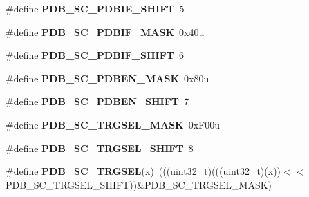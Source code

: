 \begin{DoxyCompactItemize}
\item 
\#define {\bfseries P\+D\+B\+\_\+\+S\+C\+\_\+\+P\+D\+B\+I\+E\+\_\+\+S\+H\+I\+FT}~5\hypertarget{group__PDB__Register__Masks_ga8632d420c92ec79e08c43f7d3acc79cf}{}\label{group__PDB__Register__Masks_ga8632d420c92ec79e08c43f7d3acc79cf}

\item 
\#define {\bfseries P\+D\+B\+\_\+\+S\+C\+\_\+\+P\+D\+B\+I\+F\+\_\+\+M\+A\+SK}~0x40u\hypertarget{group__PDB__Register__Masks_ga57cd111abf2b5780daddb6619498ef7a}{}\label{group__PDB__Register__Masks_ga57cd111abf2b5780daddb6619498ef7a}

\item 
\#define {\bfseries P\+D\+B\+\_\+\+S\+C\+\_\+\+P\+D\+B\+I\+F\+\_\+\+S\+H\+I\+FT}~6\hypertarget{group__PDB__Register__Masks_ga98ea01f76c8cc1bc944830d4d8387118}{}\label{group__PDB__Register__Masks_ga98ea01f76c8cc1bc944830d4d8387118}

\item 
\#define {\bfseries P\+D\+B\+\_\+\+S\+C\+\_\+\+P\+D\+B\+E\+N\+\_\+\+M\+A\+SK}~0x80u\hypertarget{group__PDB__Register__Masks_ga5582f0b88e7ae5e9dcf69f3a859c4470}{}\label{group__PDB__Register__Masks_ga5582f0b88e7ae5e9dcf69f3a859c4470}

\item 
\#define {\bfseries P\+D\+B\+\_\+\+S\+C\+\_\+\+P\+D\+B\+E\+N\+\_\+\+S\+H\+I\+FT}~7\hypertarget{group__PDB__Register__Masks_ga019fc7af809a6f3945ac3c131b90432a}{}\label{group__PDB__Register__Masks_ga019fc7af809a6f3945ac3c131b90432a}

\item 
\#define {\bfseries P\+D\+B\+\_\+\+S\+C\+\_\+\+T\+R\+G\+S\+E\+L\+\_\+\+M\+A\+SK}~0x\+F00u\hypertarget{group__PDB__Register__Masks_ga8950a99a799e9a49b602a679a64cc2e0}{}\label{group__PDB__Register__Masks_ga8950a99a799e9a49b602a679a64cc2e0}

\item 
\#define {\bfseries P\+D\+B\+\_\+\+S\+C\+\_\+\+T\+R\+G\+S\+E\+L\+\_\+\+S\+H\+I\+FT}~8\hypertarget{group__PDB__Register__Masks_gae206861ff2041634f913c44605459167}{}\label{group__PDB__Register__Masks_gae206861ff2041634f913c44605459167}

\item 
\#define {\bfseries P\+D\+B\+\_\+\+S\+C\+\_\+\+T\+R\+G\+S\+EL}(x)~(((uint32\+\_\+t)(((uint32\+\_\+t)(x))$<$$<$P\+D\+B\+\_\+\+S\+C\+\_\+\+T\+R\+G\+S\+E\+L\+\_\+\+S\+H\+I\+FT))\&P\+D\+B\+\_\+\+S\+C\+\_\+\+T\+R\+G\+S\+E\+L\+\_\+\+M\+A\+SK)\hypertarget{group__PDB__Register__Masks_gad82c5e1b8128b560787b5bdb67a70e5f}{}\label{group__PDB__Register__Masks_gad82c5e1b8128b560787b5bdb67a70e5f}


\end{DoxyCompactItemize}
